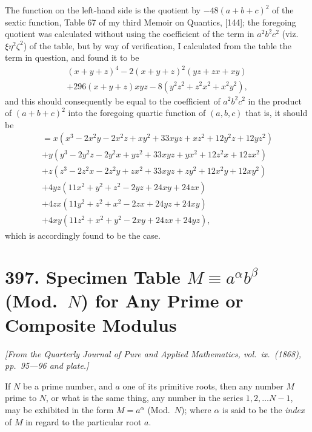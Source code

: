 \documentclass[11pt,a4paper]{article}
\theoremstyle{definition}
\begin{document}
The function on the left-hand side is the quotient by $-48(a+b+c)^2$ of the sextic function, Table 67 of my third Memoir on Quantics, [144]; the foregoing quotient was calculated without using the coefficient of the term in $a^2b^2c^2$ (viz.\ $\xi\eta^2\zeta^2$) of the table, but by way of verification, I calculated from the table the term in question, and found it to be
\begin{multline*}
(x+y+z)^4 - 2(x+y+z)^2(yz+zx+xy) \\
+ 296(x+y+z)xyz - 8(y^2z^2+z^2x^2+x^2y^2),
\end{multline*}
and this should consequently be equal to the coefficient of $a^2b^2c^2$ in the product of $(a+b+c)^2$ into the foregoing quartic function of $(a,b,c)$ that is, it should be
\begin{multline*}
= x(x^3-2x^2y-2x^2z+xy^2+33xyz+xz^2+12y^2z+12yz^2) \\
+ y(y^3-2y^2z-2y^2x+yz^2+33xyz+yx^2+12z^2x+12zx^2) \\
+ z(z^3-2z^2x-2z^2y+zx^2+33xyz+zy^2+12x^2y+12xy^2) \\
+ 4yz(11x^2+y^2+z^2-2yz+24xy+24zx) \\
+ 4zx(11y^2+z^2+x^2-2zx+24yz+24xy) \\
+ 4xy(11z^2+x^2+y^2-2xy+24zx+24yz),
\end{multline*}
which is accordingly found to be the case.

\newpage


\section*{397. Specimen Table $M \equiv a^\alpha b^\beta$ (Mod.\ $N$) for Any Prime or Composite Modulus}

\begin{flushright}
\textit{[From the Quarterly Journal of Pure and Applied Mathematics, vol.\ ix.\ (1868), pp.~95---96 and plate.]}
\end{flushright}

\vspace{0.5em}

If $N$ be a prime number, and $a$ one of its primitive roots, then any number $M$ prime to $N$, or what is the same thing, any number in the series $1, 2, \dots N-1$, may be exhibited in the form $M = a^\alpha$ (Mod.\ $N$); where $\alpha$ is said to be the \textit{index} of $M$ in regard to the particular root $a$.
\end{document}
